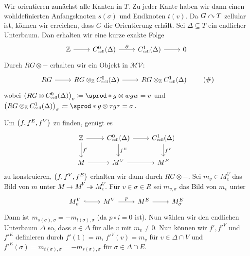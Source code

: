 \begin{beweis}
	Wir orientieren zunächst alle Kanten in $T$.
	Zu jeder Kante haben wir dann einen wohldefinierten Anfangsknoten $s(\sigma)$ und Endknoten $t(v)$.
	Da $G \acts T$ zellular ist, können wir erreichen, dass $G$ die Orientierung erhält.
	Sei $\Delta \subseteq T$ ein endlicher Unterbaum.
	Dan erhalten wir eine kurze exakte Folge
	\[
		\begin{tikzcd}
			\mathbb{Z} \rar & C^0_\cell(\Delta) \rar["\partial"] & C_\cell^1(\Delta) \rar & 0
		\end{tikzcd}
	\]
	Durch $RG \otimes -$ erhalten wir ein Objekt in $\mathcal{MV}$:
	\begin{equation}
		\begin{tikzcd}
			RG \rar & RG \otimes_\mathbb{Z} C_\cell^0(\Delta) \rar & RG \otimes_\mathbb{Z} C_\cell^1(\Delta) 
		\end{tikzcd}
		\label{eq:lem:MV} \tag{\#}
	\end{equation}
	wobei $\enbrace*{RG \otimes C_\cell^0(\Delta)}_v \coloneqq \sprod*{g \otimes w}{g w = v}$ und $\enbrace*{RG \otimes_\mathbb{Z} C_\cell^1(\Delta)}_\sigma \coloneqq \sprod*{g \otimes \tau }{g \tau = \sigma}$.
	
	Um $\enbrace*{f, f^E,f^V}$ zu finden, genügt es
	\[
		\begin{tikzcd}
			\mathbb{Z} \dar["f'"] \rar & C^0_\cell(\Delta) \dar["f^E"] \rar & C^1_\cell(\Delta) \dar["f^V"] \\
			M \rar & M^V \rar & M^E
		\end{tikzcd}
	\]
	zu konstruieren, $\enbrace*{f,f^V,f^E}$ erhalten wir dann durch $RG \otimes -$.
	Sei $m_v \in M^V_v$ das Bild von $m$ unter $M \to M^V \twoheadrightarrow M^V_v$.
	Für $v \in \sigma \in R$ sei $m_{v,\sigma}$ das Bild von $m_v$ unter 
	\[
		\begin{tikzcd}
			M^V_v \rar[hook] & M^V \rar["p"] &  M^E \rar & M^E_\sigma
		\end{tikzcd}
	\]
	Dann ist $m_{s(\sigma),\sigma} = - m_{t(\sigma),\sigma}$ (da $p \circ  i = 0$ ist).
	Nun wählen wir den endlichen Unterbaum $\Delta$ so, dass $v \in \Delta$ für alle $v$ mit $m_v\neq 0$.
	Nun können wir $f',{f'}^V$ und ${f'}^E$ definieren durch $f'(1) = m$, ${f'}^V(v) = m_v $ für $v \in  \Delta \cap V$ und ${f'}^E(\sigma) = m_{t(\sigma),\sigma} = - m_{s(\sigma),\sigma}$ für $\sigma \in  \Delta \cap E$.
\end{beweis}

